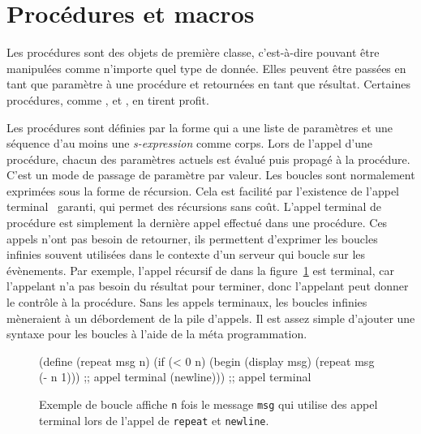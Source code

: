 \section{Procédures et macros}
\label{sec:proc_and_macro}

Les procédures sont des objets de première classe, c'est-à-dire pouvant
être manipulées comme n'importe quel type de donnée. Elles peuvent
être passées en tant que paramètre à une procédure et retournées en tant que
résultat.  Certaines procédures, comme ,  et
, en tirent profit.

Les procédures sont définies par la forme  qui a une liste de
paramètres et une séquence d'au moins une \textit{s-expression} comme corps.
Lors de l'appel d'une procédure, chacun des paramètres actuels est évalué puis
propagé à la procédure. C'est un mode de passage de paramètre par valeur. Les
boucles sont normalement exprimées sous la forme de récursion.  Cela est
facilité par l'existence de l'appel terminal~\cite{DBLP:conf/acm/Steele77}
garanti, qui permet des récursions sans coût. L'appel terminal de procédure est
simplement la dernière appel effectué dans une procédure. Ces appels n'ont pas
besoin de retourner, ils permettent d'exprimer les boucles infinies souvent
utilisées dans le contexte d'un serveur qui boucle sur les évènements.  Par
exemple, l'appel récursif de  dans la
figure~\ref{fig:appel_terminal_example} est terminal, car l'appelant n'a pas
besoin du résultat pour terminer, donc l'appelant peut donner le contrôle à la
procédure. Sans les appels terminaux, les boucles infinies mèneraient à un
débordement de la pile d'appels. Il est assez simple d'ajouter une syntaxe pour
les boucles à l'aide de la méta programmation.

\begin{figure}[ht]
  \begin{mplisting}{0.9}
(define (repeat msg n)
  (if (< 0 n)
      (begin
        (display msg)
        (repeat msg (- n 1))) ;; appel terminal
      (newline))) ;; appel terminal
\end{mplisting}
  \caption{Exemple de boucle affiche {\tt n} fois le message {\tt msg} qui
    utilise des appel terminal lors de l'appel de {\tt repeat} et
    {\tt newline}.}
  \label{fig:appel_terminal_example}
\end{figure}


